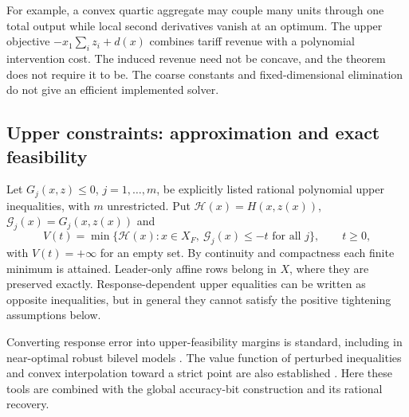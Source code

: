 For example, a convex quartic aggregate may couple many units through
one total output while local second derivatives vanish at an optimum.
The upper objective $-x_1\sum_i z_i+d(x)$ combines tariff revenue with a
polynomial intervention cost. The induced revenue need not be concave,
and the theorem does not require it to be. The coarse constants and
fixed-dimensional elimination do not give an efficient implemented
solver.

\subsection{Upper constraints: approximation and exact feasibility}
\label{subsec:accuracy-upper}

Let $G_j(x,z)\le0$, $j=1,\ldots,m$, be explicitly listed rational
polynomial upper inequalities, with $m$ unrestricted. Put
$\mathcal H(x)=H(x,z(x))$, $\mathcal G_j(x)=G_j(x,z(x))$ and
\begin{equation}\label{eq:tightened-value}
 V(t)=\min\{\mathcal H(x):x\in X_F,\ \mathcal G_j(x)\le-t
                  \text{ for all }j\},\qquad t\ge0,
\end{equation}
with $V(t)=+\infty$ for an empty set. By continuity and compactness
each finite minimum is attained. Leader-only affine rows belong in $X$,
where they are preserved exactly. Response-dependent upper equalities
can be written as opposite inequalities, but in general they cannot
satisfy the positive tightening assumptions below.

Converting response error into upper-feasibility margins is standard,
including in near-optimal robust bilevel models
\cite{BesanconAnjosBrotcorne2024}. The value function of perturbed
inequalities and convex interpolation toward a strict point are also
established \cite[Section 5.6]{BoydVandenberghe2004}. Here these tools
are combined with the global accuracy-bit construction and its rational
recovery.


